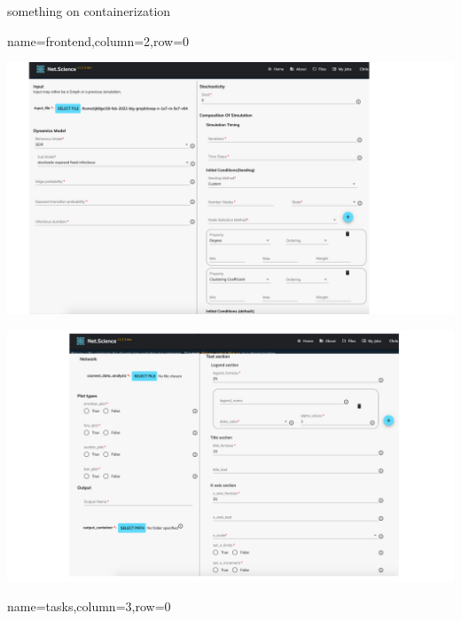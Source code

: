\documentclass[landscape,paperwidth=70in,paperheight=46in,fontscale=0.225]{baposter} %
\begin{document}
\begin{poster}
{%
something on containerization
} 


          {name=frontend,column=2,row=0}{
\includegraphics[scale=0.25]{figures/csonnet-model-seeds.pdf} 

\includegraphics[scale=0.26]{figures/plot_input.pdf}
} 

          {name=tasks,column=3,row=0}{

}
\end{poster}
\end{document}
